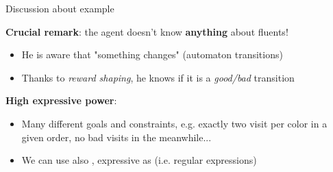 \documentclass{beamer}
\begin{document}
\begin{frame}{Discussion about \Sapientino example}
	
	\textbf{Crucial remark}: the agent doesn't know \textbf{anything} about fluents!
	\begin{itemize}
		\item He is aware that "something changes" (automaton transitions)
		\item Thanks to \emph{reward shaping}, he knows if it is a \emph{good/bad} transition
	\end{itemize}
	
	\vspace{1cm}
	\textbf{High expressive power}:
	\begin{itemize}
	\item Many different goals and constraints, e.g. exactly two visit per color in a given order, no bad visits in the meanwhile...
	
	\item We can use also \LDLf, expressive as \MSO (i.e. regular expressions)
	\end{itemize}
	
\end{frame}
\end{document}
